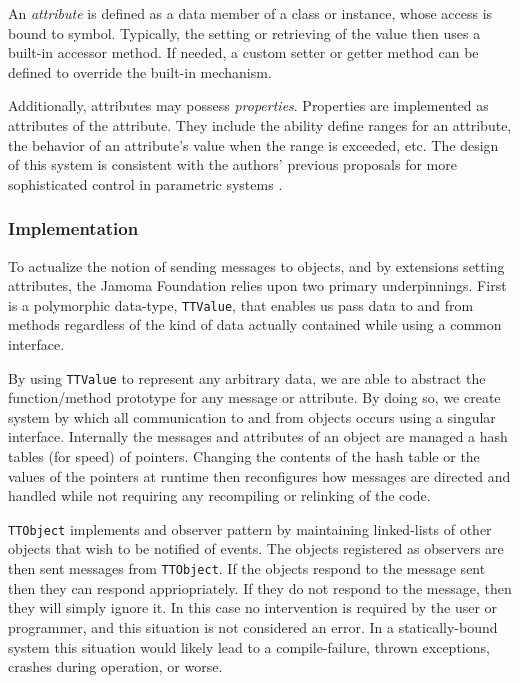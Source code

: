 \documentclass[twoside,10pt]{article}
\begin{document}
An \emph{attribute} is defined as a data member of a class or instance, whose access is bound to symbol.  Typically, the setting or retrieving of the value then uses a built-in accessor method.  If needed, a custom setter or getter method can be defined to override the built-in mechanism.

Additionally, attributes may possess \emph{properties}.  Properties are implemented as attributes of the attribute.  They include the ability define ranges for an attribute, the behavior of an attribute's value when the range is exceeded, etc.  The design of this system is consistent with the authors' previous proposals for more sophisticated control in parametric systems \cite{Place:2008params}.

\subsubsection{Implementation}

To actualize the notion of sending messages to objects, and by extensions setting attributes, the Jamoma Foundation relies upon two primary underpinnings.  First is a polymorphic data-type, \texttt{TTValue}, that enables us pass data to and from methods regardless of the kind of data actually contained while using a common interface.  %

By using \texttt{TTValue} to represent any arbitrary data, we are able to abstract the function/method prototype for any message or attribute.  By doing so, we create system by which all communication to and from objects occurs using a singular interface.  Internally the messages and attributes of an object are managed a hash tables (for speed) of pointers.  Changing the contents of the hash table or the values of the pointers at runtime then reconfigures how messages are directed and handled while not requiring any recompiling or relinking of the code.

\texttt{TTObject} implements and observer pattern by maintaining linked-lists of other objects that wish to be notified of events.  The objects registered as observers are then sent messages from \texttt{TTObject}.  If the objects respond to the message sent then they can respond appriopriately.  If they do not respond to the message, then they will simply ignore it.  In this case no intervention is required by the user or programmer, and this situation is not considered an error.  In a statically-bound system this situation would likely lead to a compile-failure, thrown exceptions, crashes during operation, or worse.
\end{document}
